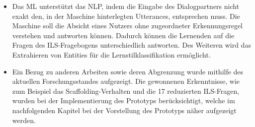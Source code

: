 \begin{itemize}
        \item Das ML unterstützt das NLP, indem die Eingabe des Dialogpartners nicht exakt den, in der Maschine hinterlegten Utterances, entsprechen muss. Die Maschine soll die Absicht eines Nutzers ohne zugeordneter Erkennungsregel verstehen und antworten können. Dadurch können die Lernenden auf die Fragen des ILS-Fragebogens unterschiedlich antworten. Des Weiteren wird das Extrahieren von Entities für die Lernstilklassifikation ermöglicht.
        \item Ein Bezug zu anderen Arbeiten sowie deren Abgrenzung wurde mithilfe des aktuellen Forschungsstandes aufgezeigt.
        Die gewonnenen Erkenntnisse, wie zum Beispiel das Scaffolding-Verhalten und die 17 reduzierten ILS-Fragen,
        wurden bei der Implementierung des Prototyps berücksichtigt, welche 
        im nachfolgenden Kapitel bei der Vorstellung des Prototyps näher aufgezeigt werden. 
    \end{itemize}